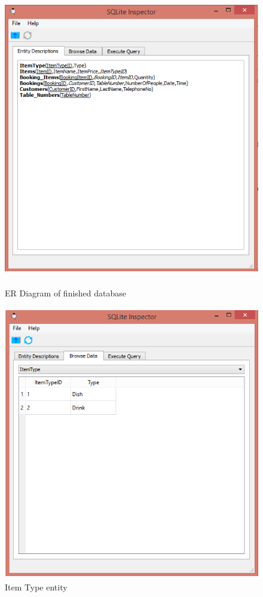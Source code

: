 \begin{figure}[H]
    \includegraphics[height = 13cm]{./Maintenance/images/entities}
    \caption{ER Diagram of finished database} \label{fig:entities}
\end{figure}

\begin{figure}[H]
    \includegraphics[height = 12cm]{./Maintenance/images/itemtype}
    \caption{Item Type entity} \label{fig:itemtype}
\end{figure}

